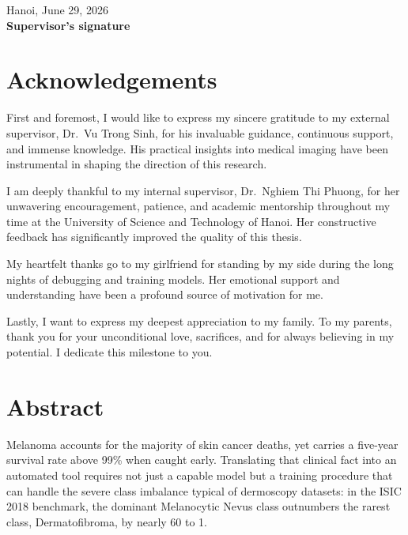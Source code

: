 \documentclass[11pt,a4paper]{report}
\begin{document}
\vspace{1.5cm}

\hfill\begin{minipage}{0.45\textwidth}
\centering
Hanoi, June 29, 2026 \\[0.3cm]
\textbf{Supervisor's signature}
\end{minipage}

\newpage

\chapter*{Acknowledgements}

First and foremost, I would like to express my sincere gratitude to my external supervisor, Dr.~Vu Trong Sinh, for his invaluable guidance, continuous support, and immense knowledge. His practical insights into medical imaging have been instrumental in shaping the direction of this research.

I am deeply thankful to my internal supervisor, Dr.~Nghiem Thi Phuong, for her unwavering encouragement, patience, and academic mentorship throughout my time at the University of Science and Technology of Hanoi. Her constructive feedback has significantly improved the quality of this thesis.

My heartfelt thanks go to my girlfriend for standing by my side during the long nights of debugging and training models. Her emotional support and understanding have been a profound source of motivation for me.

Lastly, I want to express my deepest appreciation to my family. To my parents, thank you for your unconditional love, sacrifices, and for always believing in my potential. I dedicate this milestone to you.

\chapter*{Abstract}

Melanoma accounts for the majority of skin cancer deaths, yet carries a five-year survival rate above 99\% when caught early. Translating that clinical fact into an automated tool requires not just a capable model but a training procedure that can handle the severe class imbalance typical of dermoscopy datasets: in the ISIC 2018 benchmark, the dominant Melanocytic Nevus class outnumbers the rarest class, Dermatofibroma, by nearly 60 to 1.
\end{document}
